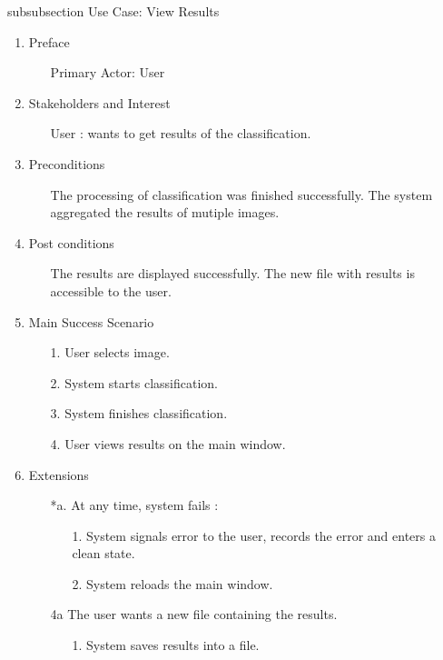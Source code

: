 \documentclass[parskip=full]{scrartcl}
\begin{document}
\pagebreak

subsubsection {Use Case: View Results } \label {uc:sip}

\begin{enumerate}
	\item Preface
	\begin{itemize} [nosep]
		\item[] Primary Actor: User
	\end{itemize}
	\item Stakeholders and Interest
	\begin{itemize} [nosep]
		\item[] User : wants to get results of the classification.
	\end{itemize}
	\item Preconditions
	\begin{itemize} [nosep]
		\item[] The processing of classification was finished successfully. The system aggregated the results of mutiple images.
	\end{itemize}
	\item Post conditions
	\begin{itemize} [nosep]
		\item[] The results are displayed successfully. The new file with results is accessible to the user.
	\end{itemize}
	\item Main Success Scenario
	\begin{itemize} [nosep]
		\item[1.] User selects image.
		\item[2.] System starts classification.
		\item[3.] System finishes classification.
		\item[4.] User views results on the main window. 
	\end{itemize}
	\item Extensions
	\begin{itemize} [nosep]
		\item[*a.] At any time, system fails :
		\begin{itemize} [nosep]
			\item[1.] System signals error to the user, records the error and enters a clean state.
			\item[2.] System reloads the main window.
		\end{itemize}
		\item[4a] The user wants a new file containing the results.
		\begin{itemize} [nosep]
			\item[1.] System saves results into a file.
		\end{itemize}
	\end{itemize}
\end{enumerate}
\end{document}
